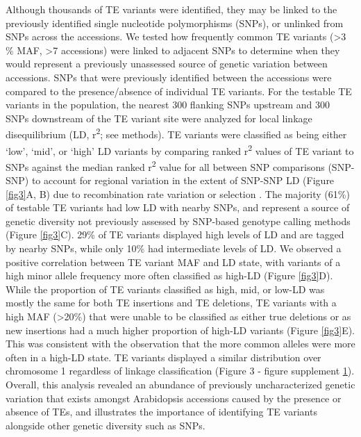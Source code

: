 \documentclass[12pt]{article}
\begin{document}
Although thousands of TE variants were identified, they may be linked
to the previously identified single nucleotide polymorphisms (SNPs),
or unlinked from SNPs across the accessions. We tested how frequently
common TE variants (\textgreater{}3 \% MAF, \textgreater{}7
accessions) were linked to adjacent SNPs to determine when they would
represent a previously unassessed source of genetic variation between
accessions.  SNPs that were previously identified between the
accessions \cite{Schmitz:2013iu} were compared to the presence/absence
of individual TE variants.  For the testable TE variants in the
population, the nearest 300 flanking SNPs upstream and 300 SNPs
downstream of the TE variant site were analyzed for local linkage
disequilibrium (LD, r\textsuperscript{2}; see methods). TE variants
were classified as being either `low', `mid', or `high' LD variants by
comparing ranked r\textsuperscript{2} values of TE variant to SNPs
against the median ranked r\textsuperscript{2} value for all between
SNP comparisons (SNP-SNP) to account for regional variation in the
extent of SNP-SNP LD (Figure \ref{fig3}A, B) due to recombination rate
variation or selection \cite{Horton:2012jh}. The majority (61\%) of
testable TE variants had low LD with nearby SNPs, and represent a
source of genetic diversity not previously assessed by SNP-based
genotype calling methods (Figure \ref{fig3}C).  29\% of TE variants
displayed high levels of LD and are tagged by nearby SNPs, while only
10\% had intermediate levels of LD. We observed a positive correlation
between TE variant MAF and LD state, with variants of a high minor
allele frequency more often classified as high-LD (Figure
\ref{fig3}D). While the proportion of TE variants classified as high,
mid, or low-LD was mostly the same for both TE insertions and TE
deletions, TE variants with a high MAF (\textgreater{}20\%) that were
unable to be classified as either true deletions or as new insertions
had a much higher proportion of high-LD variants (Figure \ref{fig3}E).
This was consistent with the observation that the more common alleles
were more often in a high-LD state.  TE variants displayed a similar
distribution over chromosome 1 regardless of linkage classification
(Figure 3 - figure supplement \hyperref[fig3s1]{1}). Overall, this
analysis revealed an abundance of previously uncharacterized genetic
variation that exists amongst Arabidopsis accessions caused by the
presence or absence of TEs, and illustrates the importance of
identifying TE variants alongside other genetic diversity such as
SNPs.
\end{document}
